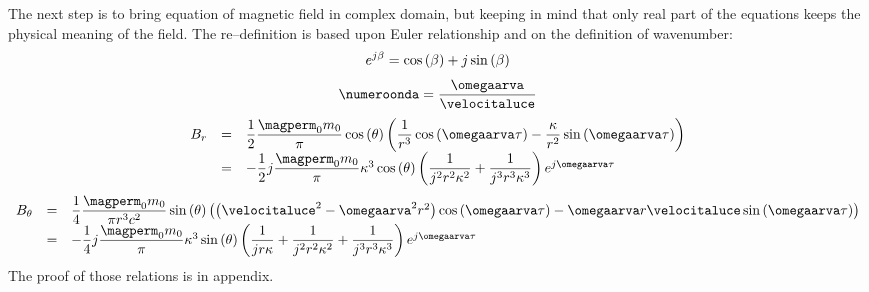 The next step is to bring equation of magnetic field in complex domain, but keeping in mind that only real part of the equations keeps the physical meaning of the field. The re--definition is based upon Euler relationship and on the definition of wavenumber:
\[
e^{j\beta} = \cos\left( \beta \right) + j \sin\left( \beta \right)
\]
\[
\numeroonda = \dfrac{\omegaarva}{\velocitaluce}
\]
\begin{equation}
\begin{array}{rcl}
B_r & = & \dfrac{1}{2} \dfrac{\magperm_0 m_0}{\pi} \ccos{\theta} \braces{\dfrac{1}{r^3}\ccos{\omegaarva \tau} - \dfrac{\kappa}{r^2} \ssin{\omegaarva \tau}} \\
 & = & -\dfrac{1}{2} j \dfrac{\magperm_0 m_0}{\pi} \kappa^3 \ccos{\theta} \braces{\dfrac{1}{j^2 r^2 \kappa^2} + \dfrac{1}{j^3 r^3 \kappa^3}} e^{j\omegaarva \tau}
\end{array}
\end{equation}
\begin{equation}
\begin{array}{rcl}
B_{\theta} & = & \dfrac{1}{4} \dfrac{\magperm_0 m_0}{\pi r^3 c^2} \ssin{\theta} \braces{\braces{\velocitaluce^2 - \omegaarva^2 r^2}\ccos{\omegaarva \tau} - \omegaarva r \velocitaluce \ssin{\omegaarva \tau}} \\
 & = & -\dfrac{1}{4} j \dfrac{\magperm_0 m_0}{\pi} \kappa^3 \ssin{\theta} \braces{\dfrac{1}{j r \kappa} + \dfrac{1}{j^2 r^2 \kappa^2} + \dfrac{1}{j^3 r^3 \kappa^3}} e^{j\omegaarva \tau}
\end{array}
\end{equation}
The proof of those relations is in appendix.



